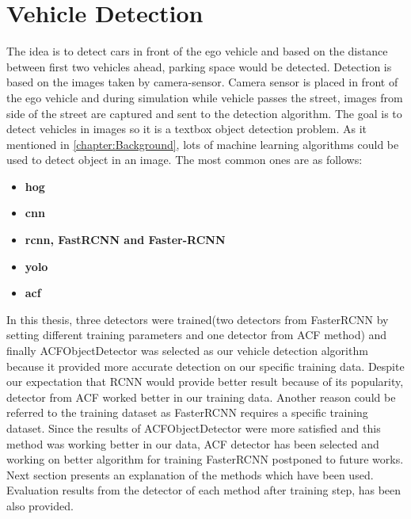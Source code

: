 \section{Vehicle Detection}\label{vehicle detection}
The idea is to detect cars in front of the ego vehicle and based on the distance between first two vehicles ahead, parking space would be detected. Detection is based on the images taken by camera-sensor. Camera sensor is placed in front of the ego vehicle and during simulation while vehicle passes the street, images from side of the street are captured and sent to the detection algorithm. The goal is to detect vehicles in images so it is a textbox object detection problem.  As it mentioned in \ref{chapter:Background}, lots of machine learning algorithms could be used to detect object in an image. The most common ones are as follows:
\begin{itemize}
\item \textbf{\acrfull{hog}}
 \item \textbf{\acrlong{cnn}}
 \item \textbf{\acrshort{rcnn}, FastRCNN and Faster-RCNN}
 \item \textbf{\acrshort{yolo}}
 \item \textbf{\acrshort{acf}}
\end{itemize}
In this thesis, three detectors were trained(two detectors from FasterRCNN by setting different training parameters and one detector from ACF method) and finally ACFObjectDetector was selected as our vehicle detection algorithm because it provided more accurate detection on our specific training data. Despite our expectation that RCNN would provide better result because of its popularity, detector from ACF worked better in our training data. Another reason could be referred to the training dataset as FasterRCNN requires a specific training dataset. Since the results of ACFObjectDetector were more satisfied and this method was working better in our data, ACF detector has been selected and working on better algorithm for training FasterRCNN postponed to future works. Next section presents an explanation of the methods which have been used. Evaluation results from the detector of each method after training step, has been also provided.
